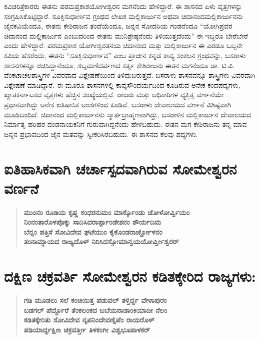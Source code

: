 ಕವಿಚರಿತ್ರೆಕಾರರು ಈತನು ಪರಮಪ್ರಕಾಶಯೋಗೀಶ್ವರನ ಮಗನೆಂದು ಹೇಳಿದ್ದಾರೆ. ಈ ಶಾಸನದ ಏಳು ವೃತ್ತಗಳನ್ನು ಸಂಗ್ರಹಿಸಿಕೊಟ್ಟಿದ್ದಾರೆ. ಸೂಕ್ತಿಸುಧಾರ್ಣವ ಗ್ರಂಥದ ಲೇಖಕ ಮಲ್ಲಿಕಾರ್ಜುನ ಅಥವಾ ಚಿದಾನಂದಮಲ್ಲಿಕಾರ್ಜುನನು ಜೈನಕವಿಯೆಂದೂ, ಈತನು ಕೇಶಿರಾಜನ ತಂದೆಯೆಂದೂ, ಜನ್ನನ ಸೋದರಿಯ ಗಂಡನೆಂದೂ “ಯೋಗಿಪ್ರವರ ಚಿದಾನಂದ ಮಲ್ಲಿಕಾರ್ಜುನ ಎಂಬುದರಿಂದ ಈತನು ಮುನಿಶ್ರೇಷ್ಠನೆಂದು ತಿಳಿಯುತ್ತದೆಂದು” ಈ ಇಬ್ಬರೂ ಬೇರೆಬೇರೆ ಎಂದು ಹೇಳಿದ್ದಾರೆ. ಪರಮಪ್ರಕಾಶ ಯೋಗೀಶ್ವರತನಯ ಚಿದಾನಂದ ಮತ್ತು ಮಲ್ಲಿಕಾರ್ಜುನ ಈ ಎರಡೂ ಒಬ್ಬನೇ ಕವಿಯ ಹೆಸರೆಂದು, ಈತನು “ಸೂಕ್ತಿಸುಧಾರ್ಣವ” ಎಂಬ ಪ್ರಾಚೀನ ಕನ್ನಡ ಕಾವ್ಯ ಸಂಕಲನ ಗ್ರಂಥವನ್ನು, ಬಸರಾಳು ಶಾಸನಗಳನ್ನೂ ರಚಿಸಿದ್ದಾನೆಂದೂ, ಶಬ್ದಮಣಿದರ್ಪಣದ ಕರ್ತೃ ಕೇಶಿರಾಜನು ಈತನ ಮಗನೆಂದೂ ಡಾ. ಟಿ.ವಿ. ವೆಂಕಟಾಚಲಶಾಸ್ತ್ರಿಗಳ ವಿವರವಾದ ವಿಶ್ಲೇಷಣೆಯಿಂದ ತಿಳಿದುಬರುತ್ತದೆ. ಬಸರಾಳು ಶಾಸನವನ್ನೂ ಶಾಸ್ತ್ರಿಗಳು ವಿವರವಾಗಿ ವಿಶ್ಲೇಷಣೆ ಮಾಡಿದ್ದಾರೆ. ಈ ಮೂರೂ ಶಾಸನಗಳಲ್ಲಿ ಕಾವ್ಯಸೌಂದರ್ಯದಿಂದ ಕೂಡಿರುವ ಅನೇಕ ಕಂದಪದ್ಯಗಳು, ಖ್ಯಾತಕರ್ನಾಟಕದ ವೃತ್ತಗಳು ಹೆಚ್ಚಿನ ಸಂಖ್ಯೆಯಲ್ಲಿವೆ. ರಾಜರು ಮತ್ತು ಅಧಿಕಾರಿಗಳ ವ್ಯಕ್ತಿತ್ವ ವರ್ಣನೆಯೇ ಪ್ರಧಾನವಾಗಿದ್ದು ಅನೇಕ ಐತಿಹಾಸಿಕ ಅಂಶಗಳಿಂದ ಕೂಡಿವೆ. ಬಸರಾಳು ದೇವಾಲಯದ ವರ್ಣನೆ ವಿಶಿಷ್ಟವಾಗಿ ಮೂಡಿಬಂದಿದೆ. ಚಿದಾನಂದ ಮಲ್ಲಿಕಾರ್ಜುನನು ಸ್ಮಾರ್ತ\break ಬ್ರಾಹ್ಮಣನಾಗಿದ್ದು, ಬಸರಾಳಿನ ಮಲ್ಲಿಕಾರ್ಜುನ ದೇವಾಲಯದ ನಿರ್ಮಾತೃ ಹರಿಹರ ದಂಡನಾಯಕನಿಗೆ ಗುರುವಾಗಿದ್ದನೆಂದು ಹೇಳಬಹುದು. ಈತನ ಮಗ ಕೇಶಿರಾಜನು ತನ್ನ ಮಾವ ಜನ್ನನ ಪ್ರಭಾವದಿಂದ ಜೈನ ಮತವನ್ನು ಸ್ವೀಕರಿಸಿರಬಹುದು. ಈ ಶಾಸನದ ಕೆಲವು ಪದ್ಯಗಳು.


\section{ಐತಿಹಾಸಿಕವಾಗಿ ಚರ್ಚಾಸ್ಪದವಾಗಿರುವ ಸೋಮೇಶ್ವರನ ವರ್ಣನೆ}

\begin{verse}
\textbf{ಮುಂನಂ ರೂಡಿಯ ಕೃಷ್ಣ ಕಂಧರನುಮಂ ಮಾರ್ಕ್ಕೊಂಡು ಚೋಳೋರ್ವ್ವಿಯಂ \\ ನಿಂನಂತಾರೊಳಪೊಕ್ಕು ಸಾದಿಸಿದರಾರ್ಪ್ಪಾಂಡೇಶನಂ ಶೌರ್ಯದಿಮ \\ ಬೆನ್ನಂ ಪತ್ತಿಸೆ ಸೋವಿದೇವ ಘಟೆಯುಂ ಕೈಕೊಂಡರಾರ್ಚ್ಚೋಳನಂ \\ ತಂನಾಮ್ನಾಯದ ರಾಜ್ಯದೊಳ್​ ನಿರಿಸಿದಸ್ಸೋಮಾನ್ವಯಯೋರ್ವ್ವೀಶ್ವರರ್​}
\end{verse}


\section{ದಕ್ಷಿಣ ಚಕ್ರವರ್ತಿ ಸೋಮೇಶ್ವರನ ಕಡಿತಕ್ಕೇರಿದ ರಾಜ್ಯಗಳು:}

\begin{verse}
\textbf{ಗಡಿ ಮೂಡಲು ಸಲೆ ಕಂಚಿಯಿತ್ತ ಪಡುವಲ್​ ತಳ್ತಿರ್ದ್ದ ವೇಳಾಪುರಂ \\ ಬಡಗಲ್​ ಪೆರ್ದ್ದೊರೆ ತೆಂಕಲಂಕದ ಬಬೆಯನಾಡಾಂಕಿಯಾದೀ ನೆಲಂ \\ ಕಡಿತಕ್ಕೇರಿತು ಸೋವಿದೇವ ನೃಪನಿಂದೇವಣ್ನಿಪೆಂ ರಾಯರೊಳ್​ \\ ಪಡಿಯಾರ್ದ್ದಕ್ಷಿಣ ಚಕ್ರವರ್ತ್ತೀ ತಿಳಕಂಗೀ ವಿಶ್ವಭೂಪಾಳಕರ್​}
\end{verse}


